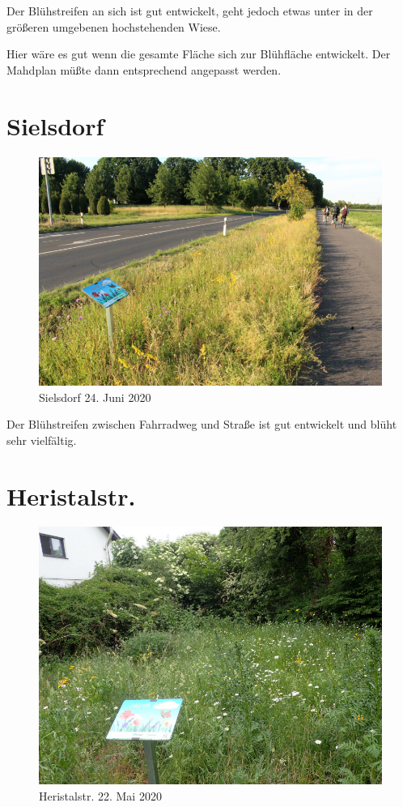 \documentclass[10pt]{article}
\begin{document}
Der Blühstreifen an sich ist gut entwickelt, geht jedoch etwas unter in der größeren umgebenen hochstehenden Wiese.

Hier wäre es gut wenn die gesamte Fläche sich zur Blühfläche entwickelt. Der Mahdplan müßte dann entsprechend angepasst werden.

\clearpage
\section{Sielsdorf}
\begin{figure}[h!]
  \includegraphics[width=\linewidth]{img/sielsdorf/juni.jpg}
  \caption{Sielsdorf 24. Juni 2020}
  \label{fig:sielsdorf}
\end{figure}

Der Blühstreifen zwischen Fahrradweg und Straße ist gut entwickelt und blüht sehr vielfältig.

\clearpage
\section{Heristalstr.}
\begin{figure}[h!]
  \includegraphics[width=\linewidth]{img/heristal/mai.jpg}
  \caption{Heristalstr. 22. Mai 2020}
  \label{fig:boat1}
\end{figure}
\end{document}
